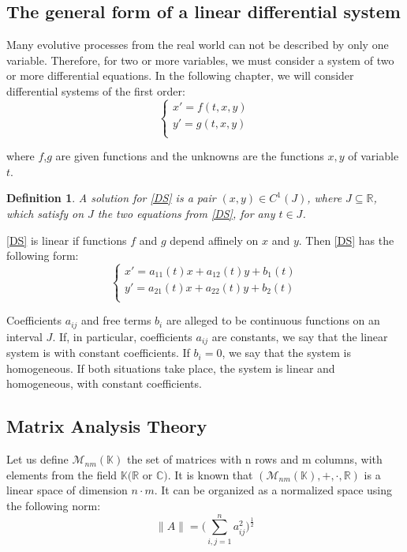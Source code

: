 \documentclass[a4paper, 11pt]{report}
\newtheorem{definition}{Definition}[subsection]
\newcommand{\R}{\mathbb{R}}
\begin{document}
\subsection{The general form of a linear differential system}
Many evolutive processes from the real world can not be described by only one variable. Therefore, for two or more variables, we must consider a system 
of two or more differential equations. In the following chapter, we will consider differential systems of the first order:
\begin{equation}
\begin{cases}
 x'=f(t,x,y)\\ 
 y'=g(t,x,y)\\
\end{cases}
 \label{DS}\tag{DS}
\end{equation}

where $f$,$g$ are given functions and the unknowns are the functions $x,y$ of variable $t$. \\

\begin{definition} 
A solution for \eqref{DS} is a pair $(x,y)\in C^{1}(J)$, where $J\subseteq \R$, which satisfy on $J$ the two equations from \eqref{DS}, for 
any $t\in J$. 
\end{definition}
 
\eqref{DS} is linear if functions $f$ and $g$ depend affinely on $x$ and $y$. Then \eqref{DS} has the following form:
\begin{equation}
 \begin{cases}
  x'=a_{11}(t)x+a_{12}(t)y+b_{1}(t)\\
  y'=a_{21}(t)x+a_{22}(t)y+b_{2}(t)\\
 \end{cases}
\label{DS*}\tag{DS*}
\end{equation}

Coefficients $a_{ij}$ and free terms $b_{i}$ are alleged to be continuous functions on an interval $J$. If, in particular, coefficients $a_{ij}$
are constants, we say that the linear system is with constant coefficients. If $b_{i}=0$, we say that the system is homogeneous. If both situations
take place, the system is linear and homogeneous, with constant coefficients.

\subsection{Matrix Analysis Theory}

Let us define $\mathcal{M}_{nm}(\mathbb{K})$ the set of matrices with n rows and m columns, with elements from the field $\mathbb{K} (\R$ or $\mathbb{C})$. It is known that $(\mathcal{M}_{nm}(\mathbb{K}), +, \cdot, \R)$ is a linear space of dimension $n\cdot m$. It can be organized as a normalized space using the following norm:
\begin{equation*}
 \rVert A \rVert = \bigg( \sum_{i,j=1}^{n} a_{ij}^{2} \bigg)^\frac{1}{2}
\end{equation*}
\end{document}

